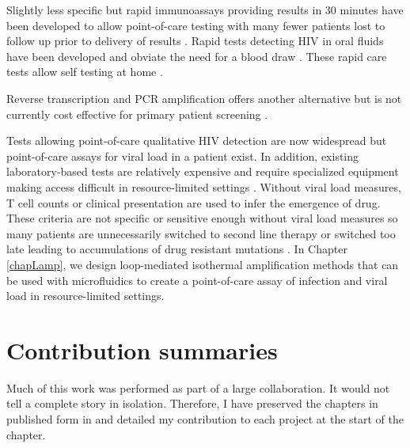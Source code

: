 \documentclass[../sherrill-Mix_thesis.tex]{subfiles}
\begin{document}
	Slightly less specific but rapid immunoassays providing results in 30 minutes have been developed to allow point-of-care testing with many fewer patients lost to follow up prior to delivery of results \citep{Kassler1995,CDCP1998,CDCP2002}. Rapid tests detecting HIV in oral fluids have been developed and obviate the need for a blood draw \citep{Gallo1997,Delaney2006,SemaBaltazar2014}. These rapid care tests allow self testing at home \citep{Granade2004,PantPai2013}.

	Reverse transcription and PCR amplification offers another alternative \citep{Hart1988,Ou1988} but is not currently cost effective for primary patient screening \citep{Long2011}.

	Tests allowing point-of-care qualitative HIV detection are now widespread but point-of-care assays for viral load in a patient exist. In addition, existing laboratory-based tests are relatively expensive and require specialized equipment making access difficult in resource-limited settings \citep{Fiscus2006,Wang2010a}. Without viral load measures, \cdFour{} T cell counts or clinical presentation are used to infer the emergence of drug. These criteria are not specific or sensitive enough without viral load measures so many patients are unnecessarily switched to second line therapy \citep{Mee2008,VanOosterhout2009} or switched too late leading to accumulations of drug resistant mutations \citep{Hosseinipour2009}.  In Chapter \ref{chapLamp}, we design loop-mediated isothermal amplification methods that can be used with microfluidics to create a point-of-care assay of infection and viral load in resource-limited settings.

\section{Contribution summaries}
	Much of this work was performed as part of a large collaboration. It would not tell a complete story in isolation. Therefore, I have preserved the chapters in published form in and detailed my contribution to each project at the start of the chapter.
\end{document}
